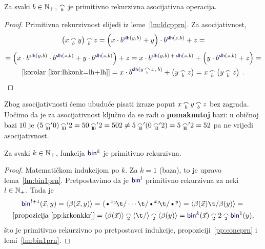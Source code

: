 \begin{propozicija}[{name=[primitivna rekurzivnost i asocijativnost konkatenacije]}]\label{pp:concprn}
Za svaki $b\in{\mathbb N}_+$, $\conc b$ je primitivno rekurzivna asocijativna operacija.
\end{propozicija}
\begin{proof}
Primitivna rekurzivnost slijedi iz leme~\ref{lm:ldcpprn}. Za asocijativnost,
\begin{multline}
    \left(x\conc b y\right)\conc b z=\left(x\cdot b^{\f{slh}(y,b)}+y\right)\cdot b^{\f{slh}(z,b)}+z=\\[1mm]
    =\left(x\cdot b^{\f{slh}(y,b)}\cdot b^{\f{slh}(z,b)}+y\cdot b^{\f{slh}(z,b)}\right)+z=
    x\cdot b^{\f{slh}(y,b)\,+\,\f{slh}(z,b)}+\left(y\cdot b^{\f{slh}(z,b)}+z\right)=\\[-1mm]
	\text{[korolar~\ref{kor:lhkonk=lh+lh}]}{}=x\cdot b^{\f{slh}(y\,\conc{{\scriptscriptstyle b}}\,z\,,\,b)}+\left(y\conc b z\right)=x\conc b\left(y\conc b z\right)\text{\qedhere\;.}
\end{multline}
\end{proof}
Zbog asocijativnosti ćemo ubuduće pisati izraze poput $x\conc by\conc bz$ bez zagrada. Uočimo da je za asocijativnost ključno da se radi o \textbf{pomaknutoj} bazi: u običnoj bazi $10$ je $(5\conc{\!1\!0\!}\!'0)\conc{\!1\!0\!}\!'2=50\conc{\!1\!0\!}\!'2=502\ne5\conc{\!1\!0\!}\!'(0\conc{\!1\!0\!}\!'2)=5\conc{\!1\!0\!}\!'2=52$ pa ne vrijedi asocijativnost.

\begin{propozicija}[{name=[primitivna rekurzivnost višemjesnog binarnog kodiranja]}]\label{pp:binkprn}
Za svaki $k\in{\mathbb N}_+$, funkcija $\f{bin}^k$ je primitivno rekurzivna.
\end{propozicija}
\begin{proof}
Matematičkom indukcijom po $k$. Za $k=1$ (baza), to je upravo lema~\ref{lm:bin1prn}. Pretpostavimo da je $\f{bin}^l$ primitivno rekurzivna za neki $l\in{\mathbb N}_+$. Tada je
\begin{multline}
    \f{bin}^{l+1}(\vec x,y)=
    \kr{\beta(\vec x,y)}=
    \kr{\text\textbullet^{x_1}\!\t/\dotsm\t/\text\textbullet^{x_l}\!\t/\text\textbullet^y}=
    \kr{\beta(\vec x)\t/\beta(y)}={}\\
    \text{[propozicija~\ref{pp:krkonkkr}]}{}=\kr{\beta(\vec x)}\conc 2\kr{\t/}\conc 2\kr{\beta(y)}=
    \f{bin}^k(\vec x)\conc22\conc2\f{bin}^1(y)\text,
\end{multline}
što je primitivno rekurzivno po pretpostavci indukcije, propoziciji~\ref{pp:concprn} i lemi~\ref{lm:bin1prn}.
\end{proof}

